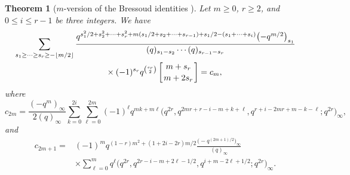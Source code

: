 \documentclass[pdftex]{sigma}
\numberwithin{equation}{section}
\newtheorem{Theorem}{Theorem}[section]
\begin{document}
\begin{Theorem}[$m$-version of the Bressoud identities {\cite[equation (3.8)]{Br80}}]\label{thm:mbr-3.8}
Let $m\geq 0$, $r \geq 2$, and $0 \leq i \leq r-1$ be three integers. We have
\begin{gather}
\sum_{s_1\geq\dots\geq s_{r}\geq-\left\lfloor m/2\right\rfloor}\frac{q^{s_1^2/2+s_2^2+\dots+s_{r}^2+m(s_1/2+s_2+\dots+s_{r-1})+s_1/2-(s_1+\dots+s_{i})}\bigl(-q^{m/2}\bigr)_{s_1}}{(q)_{s_1-s_2}\cdots(q)_{s_{r-1}-s_{r}}}\nonumber\\
\qquad{}\times(-1)^{s_r}q^{\binom{s_r}{2}}\left[{m+s_r\atop m+2s_r}\right]=c_m,\label{mbr-3.8}
\end{gather}
where
\begin{equation*}c_{2m}=\frac{(-q^m)_\infty}{2(q)_\infty}\sum_{k=0}^{2i}\sum_{\ell=0}^{2m}(-1)^\ell q^{mk+m\ell}\bigl(q^{2r},q^{2mr+r-i-m+k+\ell},q^{r+i-2mr+m-k-\ell};q^{2r}\bigr)_\infty,
\end{equation*}
and
\begin{align*}
c_{2m+1}={}&(-1)^mq^{(1-r)m^2+(1+2i-2r)m/2}\frac{\bigl(-q^{(2m+1)/2}\bigr)_\infty}{(q)_\infty}\\
&\times\sum_{\ell=0}^{m}q^{\ell}\bigl(q^{2r},q^{2r-i-m+2\ell-1/2},q^{i+m-2\ell+1/2};q^{2r}\bigr)_\infty.
\end{align*}
\end{Theorem}
\end{document}
